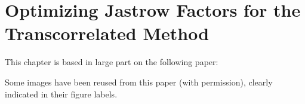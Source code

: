 \chapter{Optimizing Jastrow Factors for the Transcorrelated Method}
  \label{chap:opt}

This chapter is based in large part on the following paper:\\

Some images have been reused from this paper (with permission), clearly indicated in their figure labels.
